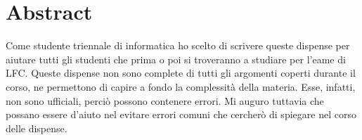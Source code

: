 \chapter*{Abstract}
Come studente triennale di informatica ho scelto di scrivere queste dispense per aiutare tutti gli studenti che prima o poi si troveranno a studiare per l'eame di LFC. Queste dispense non sono complete di tutti gli argomenti coperti durante il corso, ne permettono di capire a fondo la complessità della materia. Esse, infatti, non sono ufficiali, perciò possono contenere errori. Mi auguro tuttavia che possano essere d'aiuto nel evitare errori comuni che cercherò di spiegare nel corso delle dispense.
